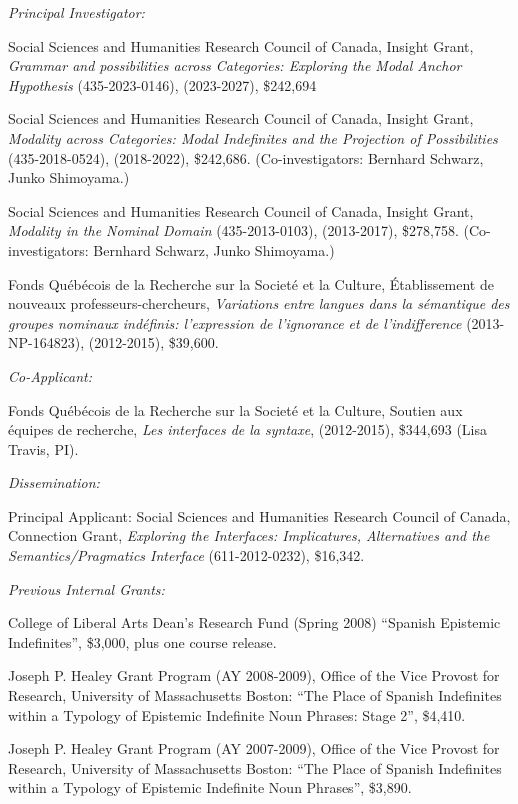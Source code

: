 \documentclass[11pt]{article}
\begin{document}
\textit{Principal Investigator:}

 Social Sciences and Humanities Research
Council of Canada, Insight Grant, \textit{Grammar and possibilities across Categories: Exploring
the Modal Anchor Hypothesis} (435-2023-0146), (2023-2027), \$242,694

 Social Sciences and Humanities Research
Council of Canada, Insight Grant, \textit{Modality across Categories: Modal Indefinites and the Projection of Possibilities} (435-2018-0524), (2018-2022), \$242,686. (Co-investigators:
Bernhard Schwarz, Junko Shimoyama.)

 Social Sciences and Humanities Research
Council of Canada, Insight Grant, \textit{Modality in the Nominal
  Domain} (435-2013-0103), (2013-2017), \$278,758. (Co-investigators:
Bernhard Schwarz, Junko Shimoyama.)

Fonds Qu\'eb\'ecois de la Recherche sur la
Societ\'e et la Culture, \'Etablissement de
nouveaux professeurs-chercheurs, \textit{Variations
  entre langues dans la s\'emantique des groupes nominaux ind\'efinis:
  l'expression de l'ignorance et de l'indifference} (2013-NP-164823),
(2012-2015), \$39,600.


\textit{Co-Applicant:} 

Fonds Qu\'eb\'ecois de la Recherche sur la
Societ\'e et la Culture, Soutien aux \'equipes de recherche,
\textit{Les interfaces de la syntaxe}, (2012-2015), \$344,693 (Lisa
Travis, PI).

\textit{Dissemination:}

Principal Applicant: Social Sciences and Humanities Research Council
of Canada, Connection Grant, \textit{Exploring the Interfaces:
  Implicatures, Alternatives and the Semantics/Pragmatics Interface}
(611-2012-0232), \$16,342. %



\textit{Previous Internal Grants:}

College of Liberal Arts Dean's Research Fund (Spring 2008) ``Spanish Epistemic Indefinites'', \$3,000, plus one course release.

Joseph P. Healey Grant Program (AY 2008-2009), Office of the
  Vice Provost for Research, University of Massachusetts Boston: ``The
  Place of Spanish Indefinites within a Typology of Epistemic
  Indefinite Noun Phrases: Stage 2'', \$4,410.

Joseph P. Healey Grant Program (AY 2007-2009), Office of the Vice Provost for Research, University of Massachusetts Boston: ``The Place of Spanish Indefinites within a Typology of Epistemic Indefinite Noun Phrases'', \$3,890.
\end{document}
